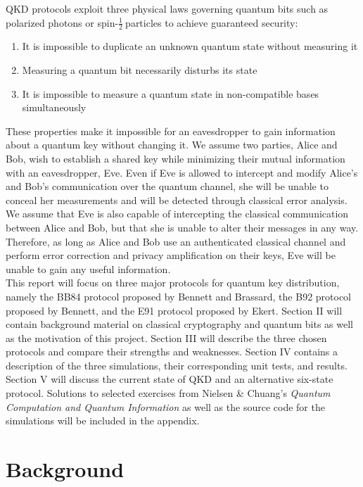 \documentclass[conference]{IEEEtran}
\begin{document}
QKD protocols exploit three physical laws governing quantum bits such as polarized photons or spin-\( \frac{1}{2}\ \)particles to achieve guaranteed security:
\begin{enumerate}
\item It is impossible to duplicate an unknown quantum state without measuring it
\item Measuring a quantum bit necessarily disturbs its state
\item It is impossible to measure a quantum state in non-compatible bases simultaneously
\end{enumerate}
These properties make it impossible for an eavesdropper to gain information about a quantum key without changing it. We assume two parties, Alice and Bob, wish to establish a shared key while minimizing their mutual information with an eavesdropper, Eve. Even if Eve is allowed to intercept and modify Alice's and Bob's communication over the quantum channel, she will be unable to conceal her measurements and will be detected through classical error analysis. We assume that Eve is also capable of intercepting the classical communication between Alice and Bob, but that she is unable to alter their messages in any way. Therefore, as long as Alice and Bob use an authenticated classical channel and perform error correction and privacy amplification on their keys, Eve will be unable to gain any useful information.\\

This report will focus on three major protocols for quantum key distribution, namely the BB84 protocol proposed by Bennett and Brassard\cite{BB84}, the B92 protocol proposed by Bennett\cite{B92}, and the E91 protocol proposed by Ekert\cite{E91}. Section II will contain background material on classical cryptography and quantum bits as well as the motivation of this project. Section III will describe the three chosen protocols and compare their strengths and weaknesses. Section IV contains a description of the three simulations, their corresponding unit tests, and results. Section V will discuss the current state of QKD and an alternative six-state protocol. Solutions to selected exercises from Nielsen \& Chuang's \textit{Quantum Computation and Quantum Information} as well as the source code for the simulations will be included in the appendix.\\

\section{Background}
\end{document}
